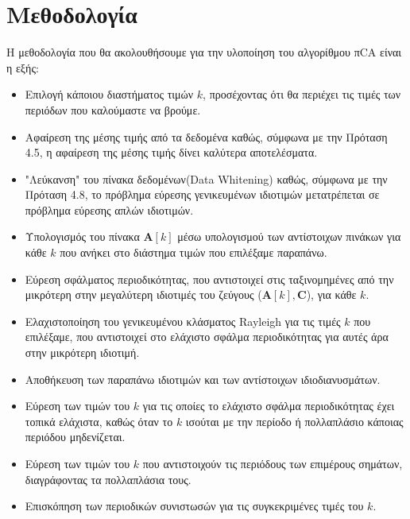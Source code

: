 \section{Μεθοδολογία}
\justifying
Η μεθοδολογία που θα ακολουθήσουμε για την υλοποίηση του αλγορίθμου πCA είναι η εξής:
\begin{itemize}
    \item Επιλογή κάποιου διαστήματος τιμών $k$, προσέχοντας ότι θα περιέχει τις τιμές των περιόδων που καλούμαστε να βρούμε.
    \item Αφαίρεση της μέσης τιμής από τα δεδομένα καθώς, σύμφωνα με την Πρόταση 4.5, η αφαίρεση της μέσης τιμής δίνει καλύτερα αποτελέσματα.
    \item "Λεύκανση" του πίνακα δεδομένων(Data Whitening) καθώς, σύμφωνα με την Πρόταση 4.8, το πρόβλημα εύρεσης γενικευμένων ιδιοτιμών μετατρέπεται σε πρόβλημα εύρεσης απλών ιδιοτιμών.
    \item Υπολογισμός του πίνακα $\mathbf{A}[k]$ μέσω υπολογισμού των αντίστοιχων πινάκων για κάθε $k$ που ανήκει στο διάστημα τιμών που επιλέξαμε παραπάνω.
    \item Εύρεση σφάλματος περιοδικότητας, που αντιστοιχεί στις ταξινομημένες από την μικρότερη στην μεγαλύτερη ιδιοτιμές του ζεύγους ($\mathbf{A}[k] , \mathbf{C}$), για κάθε $k$.
    \item Ελαχιστοποίηση του γενικευμένου κλάσματος Rayleigh για τις τιμές $k$ που επιλέξαμε, που αντιστοιχεί στο ελάχιστο σφάλμα περιοδικότητας για αυτές άρα στην μικρότερη ιδιοτιμή.
    \item Αποθήκευση των παραπάνω ιδιοτιμών και των αντίστοιχων ιδιοδιανυσμάτων.
    \item Εύρεση των τιμών του $k$ για τις οποίες το ελάχιστο σφάλμα περιοδικότητας έχει τοπικά ελάχιστα, καθώς όταν το $k$ ισούται με την περίοδο ή πολλαπλάσιο κάποιας περιόδου μηδενίζεται.
    \item Εύρεση των τιμών του $k$ που αντιστοιχούν τις περιόδους των επιμέρους σημάτων, διαγράφοντας τα πολλαπλάσια τους.
    \item Επισκόπηση των περιοδικών συνιστωσών για τις συγκεκριμένες τιμές του $k$.  
\end{itemize}
